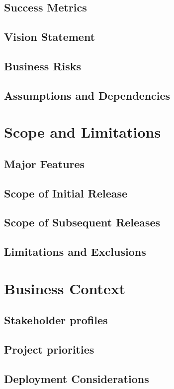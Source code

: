 \documentclass{article}
\begin{document}
\subsection{Success Metrics}

\subsection{Vision Statement}

\subsection{Business Risks}

\subsection{Assumptions and Dependencies}

\section{Scope and Limitations}

\subsection{Major Features}

\subsection{Scope of Initial Release}

\subsection{Scope of Subsequent Releases}

\subsection{Limitations and Exclusions}

\section{Business Context}

\subsection{Stakeholder profiles}

\subsection{Project priorities}

\subsection{Deployment Considerations}
\end{document}
